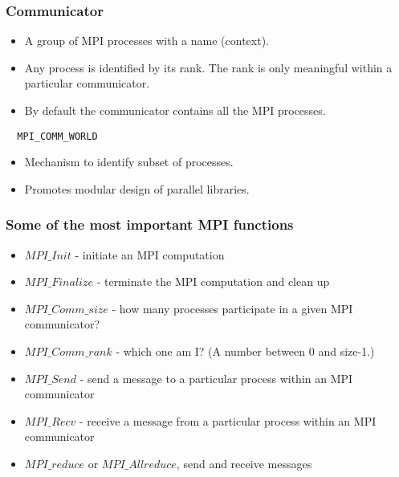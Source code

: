 \documentclass{beamer}
\begin{document}
\begin{frame}
\frametitle{Communicator}

\begin{block}{}
\begin{itemize}
\item A group of MPI processes with a name (context).

\item Any process is identified by its rank. The rank is only meaningful within a particular communicator.

\item By default the communicator contains all the MPI processes.
\end{itemize}

\noindent


\begin{verbatim}
  MPI_COMM_WORLD 

\end{verbatim}

\begin{itemize}
\item Mechanism to identify subset of processes.

\item Promotes modular design of parallel libraries.
\end{itemize}

\noindent
\end{block}
\end{frame}

\begin{frame}
\frametitle{Some of the most  important MPI functions}

\begin{block}{}

\begin{itemize}
\item $MPI\_Init$ - initiate an MPI computation

\item $MPI\_Finalize$ - terminate the MPI computation and clean up

\item $MPI\_Comm\_size$ - how many processes participate in a given MPI communicator?

\item $MPI\_Comm\_rank$ - which one am I? (A number between 0 and size-1.)

\item $MPI\_Send$ - send a message to a particular process within an MPI communicator

\item $MPI\_Recv$ - receive a message from a particular process within an MPI communicator

\item $MPI\_reduce$  or $MPI\_Allreduce$, send and receive messages
\end{itemize}

\noindent
\end{block}
\end{frame}
\end{document}

